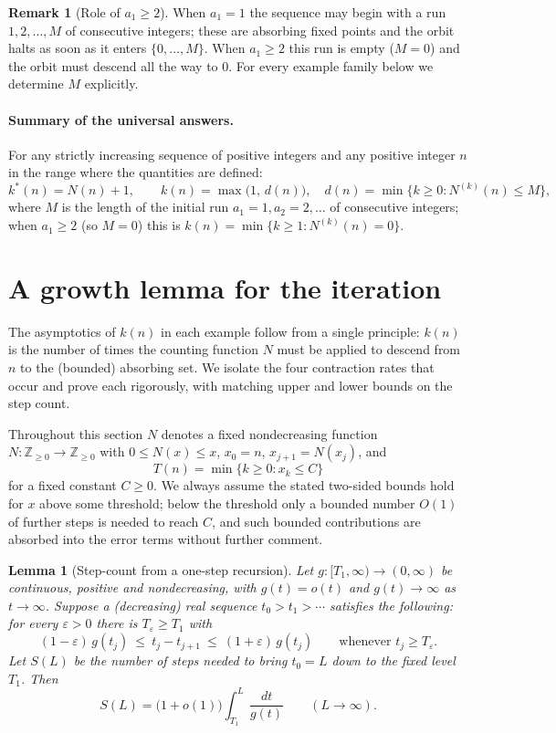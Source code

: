 \documentclass[12pt]{article}
\newtheorem{lemma}{Lemma}
\theoremstyle{definition}
\newtheorem{remark}{Remark}
\begin{document}
\begin{remark}[Role of $a_1\ge 2$]
When $a_1=1$ the sequence may begin with a run $1,2,\dots,M$ of consecutive integers;
these are absorbing fixed points and the orbit halts as soon as it enters
$\{0,\dots,M\}$. When $a_1\ge2$ this run is empty ($M=0$) and the orbit must descend
all the way to $0$. For every example family below we determine $M$ explicitly.
\end{remark}

\paragraph{Summary of the universal answers.}
For any strictly increasing sequence of positive integers and any positive integer
$n$ in the range where the quantities are defined:
\[
  k^*(n)=N(n)+1,\qquad
  k(n)=\max\bigl(1,\,d(n)\bigr),\quad
  d(n)=\min\{k\ge0:N^{(k)}(n)\le M\},
\]
where $M$ is the length of the initial run $a_1=1,a_2=2,\dots$ of consecutive
integers; when $a_1\ge2$ (so $M=0$) this is $k(n)=\min\{k\ge1:N^{(k)}(n)=0\}$.

\section{A growth lemma for the iteration}

The asymptotics of $k(n)$ in each example follow from a single principle: $k(n)$ is
the number of times the counting function $N$ must be applied to descend from $n$ to
the (bounded) absorbing set. We isolate the four contraction rates that occur and
prove each rigorously, with matching upper and lower bounds on the step count.

Throughout this section $N$ denotes a fixed nondecreasing function
$N\colon\mathbb Z_{\ge0}\to\mathbb Z_{\ge0}$ with $0\le N(x)\le x$, $x_0=n$,
$x_{j+1}=N(x_j)$, and
\[
  T(n)=\min\{k\ge0:x_k\le C\}
\]
for a fixed constant $C\ge0$. We always assume the stated two-sided bounds hold for
$x$ above some threshold; below the threshold only a bounded number $O(1)$ of further
steps is needed to reach $C$, and such bounded contributions are absorbed into the
error terms without further comment.

\begin{lemma}[Step-count from a one-step recursion]\label{lem:stepcount}
Let $g\colon[T_1,\infty)\to(0,\infty)$ be continuous, positive and nondecreasing,
with $g(t)=o(t)$ and $g(t)\to\infty$ as $t\to\infty$. Suppose a (decreasing) real
sequence $t_0>t_1>\cdots$ satisfies the following: for every $\varepsilon>0$ there is
$T_\varepsilon\ge T_1$ with
\[
  (1-\varepsilon)\,g(t_j)\ \le\ t_j-t_{j+1}\ \le\ (1+\varepsilon)\,g(t_j)
  \qquad\text{whenever } t_j\ge T_\varepsilon.
\]
Let $S(L)$ be the number of steps needed to bring $t_0=L$ down to the fixed level
$T_1$. Then
\[
  S(L)=\bigl(1+o(1)\bigr)\int_{T_1}^{L}\frac{dt}{g(t)}\qquad(L\to\infty).
\]
\end{lemma}
\end{document}
